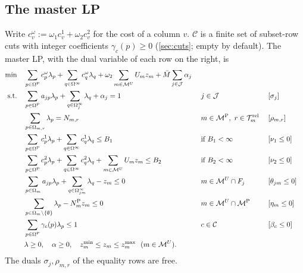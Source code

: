 \documentclass[11pt,a4paper]{article}
\theoremstyle{definition}
\theoremstyle{remark}
\newcommand{\J}{\mathcal{J}}
\newcommand{\M}{\mathcal{M}}
\newcommand{\MP}{\M^{\mathrm{P}}}
\newcommand{\MU}{\M^{U}}
\newcommand{\Rel}{\mathcal{T}^{\mathrm{rel}}}
\newcommand{\Om}{\Omega}
\newcommand{\Cuts}{\mathcal{C}}
\begin{document}
\subsection{The master LP}
Write $c^\omega_v:=\omega_1c^1_v+\omega_2c^2_v$ for the cost of a column $v$.
$\Cuts$ is a finite set of subset-row cuts with integer coefficients
$\gamma_c(p)\ge0$ (\cref{sec:cuts}; empty by default). The master LP, with the
dual variable of each row on the right, is
\begin{alignat}{3}
\min\quad & \sum_{p\in\Om^{\mathrm P}}c^\omega_p\lambda_p
 +\sum_{q\in\Om^\infty}c^\omega_q\lambda_q
 +\omega_2\sum_{m\in\MU}U_m z_m+\bar M\sum_{j\in\J}\alpha_j \notag\\
\text{s.t.}\quad
& \sum_{p\in\Om^{\mathrm P}} a_{jp}\lambda_p+\sum_{q\in\Om^\infty_j}\lambda_q+\alpha_j = 1
  &\;& j\in\J &\;& [\sigma_j] \label{eq:cover}\\
& \sum_{p\in\Om_{m,r}}\lambda_p = N_{m,r}
  && m\in\MP,\ r\in\Rel_m && [\rho_{m,r}] \label{eq:fleet}\\
& \sum_{p\in\Om^{\mathrm P}}c^1_p\lambda_p+\sum_{q\in\Om^\infty}c^1_q\lambda_q \le B_1
  && \text{if } B_1<\infty && [\nu_1\le0] \label{eq:b1}\\
& \sum_{p\in\Om^{\mathrm P}}c^2_p\lambda_p+\sum_{q\in\Om^\infty}c^2_q\lambda_q+\sum_{m\in\MU}U_mz_m \le B_2
  && \text{if } B_2<\infty && [\nu_2\le0] \label{eq:b2}\\
& \sum_{p\in\Om_m}a_{jp}\lambda_p+\sum_{q\in\Om^\infty_{jm}}\lambda_q - z_m\le 0
  && m\in\MU\cap F_j && [\theta_{jm}\le0] \label{eq:link}\\
& \sum_{p\in\Om_m\setminus\{\emptyset\}}\lambda_p - N^{\mathrm{P}}_m z_m\le 0
  && m\in\MU\cap\MP && [\eta_m\le0] \label{eq:act}\\
& \sum_{p\in\Om^{\mathrm P}}\gamma_c(p)\lambda_p\le 1
  && c\in\Cuts && [\beta_c\le0] \label{eq:cut}\\
& \lambda\ge0,\quad \alpha\ge0,\quad z^{\min}_m\le z_m\le z^{\max}_m\ \ (m\in\MU). \notag
\end{alignat}
The duals $\sigma_j,\rho_{m,r}$ of the equality rows are free.
\end{document}
